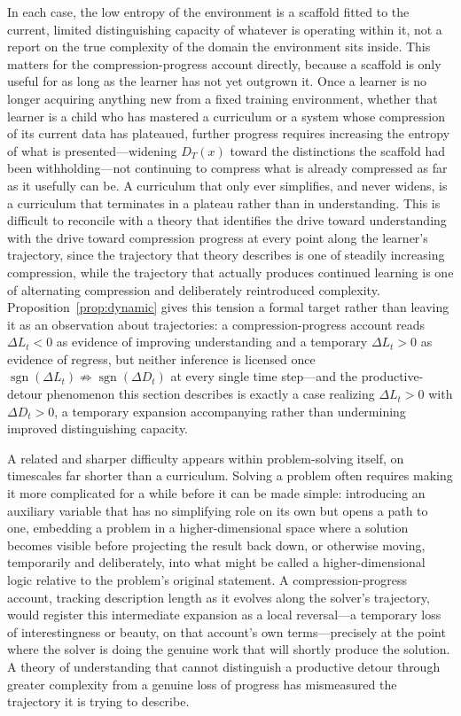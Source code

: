 \documentclass[11pt]{article}
\theoremstyle{plain}
\begin{document}
In each case, the low entropy of the environment is a scaffold fitted to the current, limited distinguishing capacity of whatever is operating within it, not a report on the true complexity of the domain the environment sits inside. This matters for the compression-progress account directly, because a scaffold is only useful for as long as the learner has not yet outgrown it. Once a learner is no longer acquiring anything new from a fixed training environment, whether that learner is a child who has mastered a curriculum or a system whose compression of its current data has plateaued, further progress requires increasing the entropy of what is presented---widening $D_T(x)$ toward the distinctions the scaffold had been withholding---not continuing to compress what is already compressed as far as it usefully can be. A curriculum that only ever simplifies, and never widens, is a curriculum that terminates in a plateau rather than in understanding. This is difficult to reconcile with a theory that identifies the drive toward understanding with the drive toward compression progress at every point along the learner's trajectory, since the trajectory that theory describes is one of steadily increasing compression, while the trajectory that actually produces continued learning is one of alternating compression and deliberately reintroduced complexity. Proposition~\ref{prop:dynamic} gives this tension a formal target rather than leaving it as an observation about trajectories: a compression-progress account reads $\Delta L_t < 0$ as evidence of improving understanding and a temporary $\Delta L_t > 0$ as evidence of regress, but neither inference is licensed once $\operatorname{sgn}(\Delta L_t) \not\Rightarrow \operatorname{sgn}(\Delta D_t)$ at every single time step---and the productive-detour phenomenon this section describes is exactly a case realizing $\Delta L_t > 0$ with $\Delta D_t > 0$, a temporary expansion accompanying rather than undermining improved distinguishing capacity.

A related and sharper difficulty appears within problem-solving itself, on timescales far shorter than a curriculum. Solving a problem often requires making it more complicated for a while before it can be made simple: introducing an auxiliary variable that has no simplifying role on its own but opens a path to one, embedding a problem in a higher-dimensional space where a solution becomes visible before projecting the result back down, or otherwise moving, temporarily and deliberately, into what might be called a higher-dimensional logic relative to the problem's original statement. A compression-progress account, tracking description length as it evolves along the solver's trajectory, would register this intermediate expansion as a local reversal---a temporary loss of interestingness or beauty, on that account's own terms---precisely at the point where the solver is doing the genuine work that will shortly produce the solution. A theory of understanding that cannot distinguish a productive detour through greater complexity from a genuine loss of progress has mismeasured the trajectory it is trying to describe.
\end{document}
